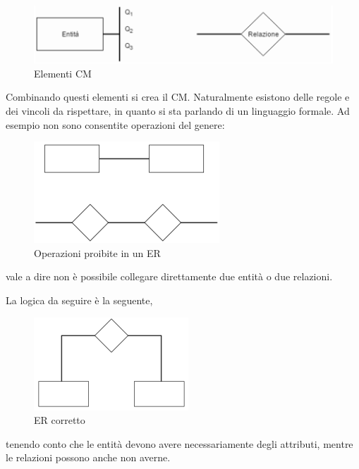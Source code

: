 \begin{center}
\begin{figure}[H]
\centering
\includegraphics[scale=1]{figures/ER.png}
\caption{Elementi CM} 
\end{figure}
\end{center}

Combinando questi elementi si crea il CM. Naturalmente esistono delle regole e dei vincoli da rispettare, in quanto si sta parlando di un linguaggio formale. Ad esempio non sono consentite operazioni del genere:

\begin{center}
\begin{figure}[H]
\centering
\includegraphics[scale=1]{figures/ERcomb.png}
\caption{Operazioni proibite in un ER} 
\end{figure}
\end{center}

vale a dire non è possibile collegare direttamente due entità o due relazioni. 

La logica da seguire è la seguente,

\begin{center}
\begin{figure}[H]
\centering
\includegraphics[scale=1]{figures/correctER.png}
\caption{ER corretto} 
\end{figure}
\end{center}

tenendo conto che le entità devono avere necessariamente degli attributi, mentre le relazioni possono anche non averne. 

